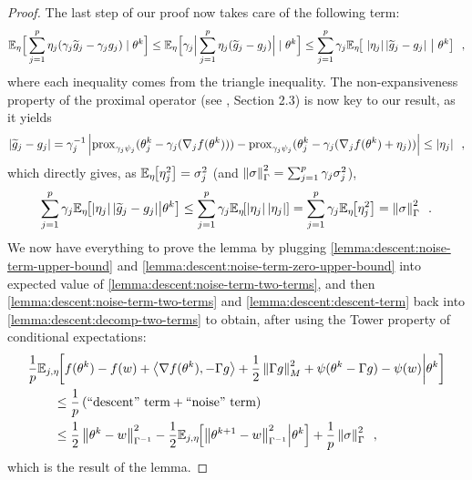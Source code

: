 \begin{proof}
  The last step of our proof now takes care of the following term:
  \begin{align}
    \mathbb E_\eta \Big[ \sum_{j=1}^p \eta_j (\gamma_j \widetilde g_j - \gamma_j g_j) \mid \theta^k \Big]
    \le \mathbb E_{\eta}\Big[ \gamma_j \Big|\sum_{j=1}^p \eta_j (\widetilde g_j - g_j)\Big| \mid \theta^k \Big]
    \le \sum_{j=1}^p \gamma_j \mathbb E_{\eta} \hspace{-0.29em} \left[ ~\left| \eta_j \right| \left| \widetilde g_j - g_j \right|~ \middle\vert ~\theta^k \right]\enspace,
  \end{align}
  where each inequality comes from the triangle inequality.
  The non-expansiveness property of the proximal operator (see
  \citet{parikh2014Proximal},
  Section 2.3) is now key to our result, as it yields
  \begin{align}
    \left| \widetilde g_j - g_j \right|
    = \gamma_j^{-1} \left| \operatorname{prox}_{\gamma_j \psi_j}(\theta^k_j - \gamma_j (\nabla_j f(\theta^k)))
    - \operatorname{prox}_{\gamma_j \psi_j}(\theta^k_j - \gamma_j (\nabla_j f(\theta^k) + \eta_j))  \right|
    \le \left| \eta_j \right|\enspace,
  \end{align}
  which directly gives, as $\mathbb E_{\eta} \hspace{-0.29em} \left[ \eta_j^2 \right] = \sigma_j^2$
  (and $\left \lVert \sigma \right \rVert_\Gamma^2 = \sum_{j=1}^p \gamma_j \sigma_j^2$),
  \begin{align}
    \sum_{j=1}^p \gamma_j \mathbb E_{\eta} \hspace{-0.29em} \left[ \left| \eta_j \right| \left| \widetilde g_j - g_j \right| \middle\vert \theta^k \right]
    \le \sum_{j=1}^p \gamma_j \mathbb E_{\eta} \hspace{-0.29em} \left[ \left| \eta_j \right| \left| \eta_j \right| \right]
    = \sum_{j=1}^p \gamma_j \mathbb E_{\eta} \hspace{-0.29em} \left[ \eta_j^2 \right]
    = \left \lVert \sigma \right \rVert_\Gamma^2\enspace. \label{lemma:descent:noise-term-upper-bound}
  \end{align}
  We now have everything to prove the lemma by plugging
  \eqref{lemma:descent:noise-term-upper-bound} and \eqref{lemma:descent:noise-term-zero-upper-bound}
  into expected value of \eqref{lemma:descent:noise-term-two-terms}, and then
  \eqref{lemma:descent:noise-term-two-terms} and \eqref{lemma:descent:descent-term}
  back into \eqref{lemma:descent:decomp-two-terms} to obtain, after using
  the Tower property of conditional expectations:
  \begin{align}
     & \frac{1}{p}\mathbb E_{j,\eta} \hspace{-0.29em} \left[ f(\theta^k) - f(w) + \left\langle \nabla f(\theta^k), - \Gamma g \right\rangle
      + \frac{1}{2}\left \lVert \Gamma g \right \rVert_{M}^2
      + \psi(\theta^k - \Gamma g) - \psi(w) \middle\vert \theta^k \right]                                                                                              \\
     & \qquad \le \frac{1}{p} \left( \text{``descent'' term} + \text{``noise'' term} \right)                                                        \\
     & \qquad \le \frac{1}{2}\left \lVert \theta^k - w \right \rVert_{\Gamma^{-1}}^2 - \frac{1}{2}\mathbb E_{j,\eta} \hspace{-0.29em} \left[ \left \lVert \theta^{k+1} - w \right \rVert_{\Gamma^{-1}}^2 \middle\vert \theta^k \right]
    + \frac{1}{p}\left \lVert \sigma \right \rVert_\Gamma^2\enspace,
  \end{align}
  which is the result of the lemma.
\end{proof}

